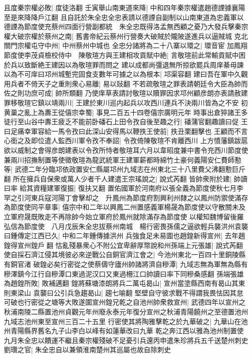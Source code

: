 且度秦宗權必敗|{
	度徒洛翻}
壬寅舉山南東道來降|{
	中和四年秦宗權遣趙德諲據襄陽至是來降降戶江翻}
且自託於朱全忠全忠表請以德諲自副制以山南東道為忠義軍以德諲為節度使充蔡州四面行營副都統　朱全忠既得洛孟無西顧之憂乃大發兵擊秦宗權大破宗權於蔡州之南|{
	舊書帝紀云蔡州行營奏大破賊於隴陂遂進兵以逼賊城}
克北關門宗權屯守中州|{
	中州蔡州中城也}
全忠分諸將為二十八寨以環之|{
	環音宦}
加鳳翔節度使李茂貞檢校侍中　陳敬瑄方與王建相攻貢賦中絶|{
	言敬瑄前此常輸貢賦中困於兵以致斷絶王建因以為敬瑄罪而問之}
建以成都尚彊退無所掠欲罷兵周庠綦毋諫以為不可庠曰邛州城塹完固食支數年可據之以為根本|{
	邛渠容翻}
建曰吾在軍中久觀用兵者不倚天子之重則衆心易離|{
	易以䜴翻}
不若疏敬瑄之罪表請朝廷令大臣為帥而佐之則功庶可成|{
	帥所類翻}
乃使庠草表請討敬瑄以贖罪因求邛州顧彦朗亦表請赦建罪移敬瑄它鎮以靖兩川|{
	王建於東川巡内起兵以攻西川連兵不決兩川皆為之不安}
初黄巢之亂上為夀王從僖宗幸蜀|{
	事見二百五十四卷僖宗廣明元年}
時事出倉猝諸王多徒行至山谷中夀王疲乏不能前卧磻石上田令孜自後至趣之行|{
	磻蒲官翻趣讀曰促}
王曰足痛幸軍容給一馬令孜曰此深山安得馬以鞭抶王使前|{
	抶丑栗翻擊也}
王顧而不言心銜之及即位遣人監西川軍令孜不奉詔|{
	令孜倚陳敬瑄不肯離西川}
上方憤藩鎮跋扈欲以威制之會得彦朗建表以令孜所恃者敬瑄耳六月以韋昭度兼中書令充西川節度使兼兩川招撫制置等使徵敬瑄為龍武統軍王建軍薪都時綿竹土豪何義陽安仁費師懃等|{
	武德二年分臨邛依政置安仁縣屬邛州九域志在州東北三十八里費父沸翻懃巨斤翻}
所在擁兵自保衆或萬人少者千人建遣王宗瑤說之|{
	說式芮翻}
皆帥衆附於建|{
	帥讀曰率}
給其資糧建軍復振|{
	復扶又翻}
置佑國軍於河南府以張全義為節度使秋七月李罕之引河東兵寇河陽丁會擊却之　升鳳州為節度府割興利州隸之以鳳州防禦使滿存為節度使同平章事|{
	僖宗中和二年以興鳳二州置感義軍楊晟為節度使以守散關未及立軍府晟既敗走不再除帥今始立軍府於鳳州就除滿存為節度使}
以權知魏博留後羅弘信為節度使　八月戊辰朱全忠拔蔡州南城　楊行密畏孫儒之逼欲輕兵襲洪州袁襲曰鍾傳定江西已久|{
	中和二年鍾傳據洪州}
兵強食足未易圖也趙鍠新得宣州|{
	去年趙鍠得宣州鍠戶翻}
怙亂殘暴衆心不附公宜卑辭厚幣說和州孫端上元張雄|{
	說式芮翻}
使自採石濟江侵其境彼必來逆戰公自銅官濟江會之|{
	今池州東北一百四十里銅陵縣有銅官渚}
破鍠必矣行密從之使蔡儔守廬州帥諸將濟自糝潭|{
	九域志無為軍無為縣有糝澤鎮今江行自糝潭口東過泥汉口又東過柵江口帥讀曰率下同糝桑感翻}
孫端張雄為趙鍠所敗|{
	敗補邁翻}
鍠將蘇塘漆朗將兵二萬屯曷山|{
	宣州當塗縣西南有曷山其東則東梁山}
袁襲曰公引兵急趨曷山|{
	趨七喻翻}
堅壁自守彼求戰不得謂我畏怯因其怠可破也行密從之塘等大敗遂圍宣州鍠兄乾之自池州帥衆救宣州|{
	武德四年以宣州之秋浦南陵二縣置池州貞觀元年州廢永泰元年復分宣州之秋浦青陽饒州之至德置池州九域志池州東至宣州三百二十五里}
行密使其將陶雅擊乾之於九華破之|{
	九華山在池州青陽縣界舊名九子山李白以峰有如蓮華改曰九華}
乾之奔江西以雅為池州制置使　九月朱全忠以饋運不繼且秦宗權殘破不足憂引兵還丙申遣朱珍將兵五千送楚州刺史劉瓚之官|{
	朱全忠自以兼領淮南楚州其巡屬也故自除刺史}
